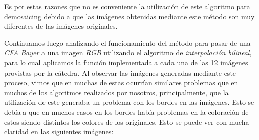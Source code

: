 \documentclass[10pt, a4paper]{article}
\begin{document}
Es por estas razones que no es conveniente la utilizaci\'on de este algoritmo para demosaicing debido a que las im\'agenes obtenidas mediante este m\'etodo son muy diferentes de las im\'agenes originales.

Continuamos luego analizando el funcionamiento del m\'etodo para pasar de una \textit{CFA Bayer} a una imagen \textit{RGB} utilizando el algoritmo de \textit{interpolaci\'on bilineal}, para lo cual aplicamos la funci\'on implementada a cada una de las 12 im\'agenes provistas por la c\'atedra. Al observar las im\'agenes generadas mediante este proceso, vimos que en muchas de estas ocurr\'ian similares problemas que en muchos de los algoritmos realizados por nosotros, principalmente, que la utilizaci\'on de este generaba un problema con los bordes en las im\'agenes. Esto se deb\'ia a que en muchos casos en los bordes hab\'ia problemas en la coloraci\'on de estos siendo distintos los colores de los originales. Esto se puede ver con mucha claridad en las siguientes im\'agenes:
\end{document}
